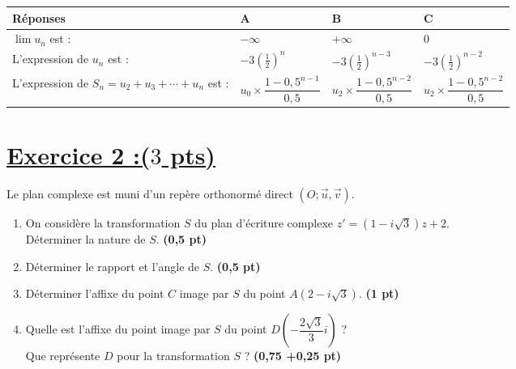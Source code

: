 \documentclass[12pt,a4paper]{article}
\begin{document}
\begin{enumerate}
    \begin{center}
    \renewcommand{\arraystretch}{1.5}
    \begin{tabular}{|>{\centering\arraybackslash}m{5cm}|>{\centering\arraybackslash}m{3cm}|>{\centering\arraybackslash}m{3cm}|>{\centering\arraybackslash}m{3cm}|}
        \hline
        \textbf{Réponses} & \textbf{A} & \textbf{B} & \textbf{C} \\
        \hline
        \( \lim u_n \) est : & \( -\infty \) & \( +\infty \) & \( 0 \) \\
        \hline
        L’expression de \( u_n \) est : & 
        \( -3\left( \frac{1}{2} \right)^n \) & 
        \( -3\left( \frac{1}{2} \right)^{n-3} \) & 
        \( -3\left( \frac{1}{2} \right)^{n-2} \) \\
        \hline
        L’expression de \( S_n = u_2 + u_3 + \cdots + u_n \) est : & 
        \( u_0 \times \dfrac{1 - 0{,}5^{n-1}}{0{,}5} \) & 
        \( u_2 \times \dfrac{1 - 0{,}5^{n-2}}{0{,}5} \) & 
        \( u_2 \times \dfrac{1 - 0{,}5^{n-2}}{0{,}5} \) \\
        \hline
    \end{tabular}
    \end{center}

\end{enumerate}

\section*{\underline{Exercice 2 :($3$ pts)} }
Le plan complexe est muni d’un repère orthonormé direct \( (O ; \vec{u}, \vec{v}) \). 

\begin{enumerate}
    \item On considère la transformation \( S \) du plan d’écriture complexe \( z' = (1 - i\sqrt{3})z + 2 \).\\
    Déterminer la nature de \( S \). \hfill \textbf{(0,5 pt)}
    
    \item Déterminer le rapport et l’angle de \( S \). \hfill \textbf{(0,5 pt)}
    
    \item Déterminer l’affixe du point \( C \) image par \( S \) du point \( A(2 - i\sqrt{3}) \). \hfill \textbf{(1 pt)}
    
    \item Quelle est l’affixe du point image par \( S \) du point \( D\left(-\dfrac{2\sqrt{3}}{3}i\right) \) ?\\
    Que représente \( D \) pour la transformation \( S \) ? \hfill \textbf{(0,75 +0,25 pt)}
\end{enumerate}
\end{document}

